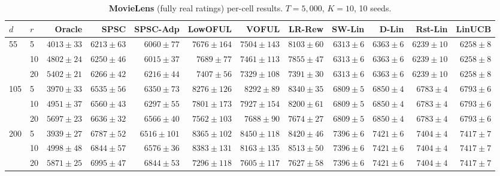\begin{table}[!htbp]
\centering
\caption{\textbf{MovieLens} (fully real ratings) per-cell results. $T{=}5{,}000$, $K{=}10$, 10 seeds.}
\label{tab:app-movielens}
\scriptsize
\setlength{\tabcolsep}{3pt}
\begin{tabular}{llrrrrrrrrrr}
\toprule
$d$ & $r$ & Oracle & \textbf{SPSC} & \textbf{SPSC-Adp} & LowOFUL & VOFUL & LR-Rew & SW-Lin & D-Lin & Rst-Lin & LinUCB \\
\midrule
55 & 5 & $4013{\pm}33$ & \cellcolor{green!12}$6213{\pm}63$ & \cellcolor{green!12}$6060{\pm}77$ & $7676{\pm}164$ & $7504{\pm}143$ & $8103{\pm}60$ & $6313{\pm}6$ & $6363{\pm}6$ & \underline{$6239{\pm}10$} & $6258{\pm}8$ \\
 & 10 & $4802{\pm}24$ & $6250{\pm}46$ & \cellcolor{green!12}$6015{\pm}37$ & $7689{\pm}77$ & $7461{\pm}113$ & $7855{\pm}47$ & $6313{\pm}6$ & $6363{\pm}6$ & \underline{$6239{\pm}10$} & $6258{\pm}8$ \\
 & 20 & $5402{\pm}21$ & $6266{\pm}42$ & \cellcolor{green!12}$6216{\pm}44$ & $7407{\pm}56$ & $7329{\pm}108$ & $7391{\pm}30$ & $6313{\pm}6$ & $6363{\pm}6$ & \underline{$6239{\pm}10$} & $6258{\pm}8$ \\
105 & 5 & $3970{\pm}33$ & \cellcolor{green!12}$6535{\pm}56$ & \cellcolor{green!12}$6350{\pm}73$ & $8276{\pm}126$ & $8292{\pm}89$ & $8340{\pm}35$ & $6809{\pm}5$ & $6850{\pm}4$ & \underline{$6783{\pm}4$} & $6793{\pm}6$ \\
 & 10 & $4951{\pm}37$ & \cellcolor{green!12}$6560{\pm}43$ & \cellcolor{green!12}$6297{\pm}55$ & $7801{\pm}173$ & $7927{\pm}154$ & $8200{\pm}61$ & $6809{\pm}5$ & $6850{\pm}4$ & \underline{$6783{\pm}4$} & $6793{\pm}6$ \\
 & 20 & $5697{\pm}23$ & \cellcolor{green!12}$6636{\pm}32$ & \cellcolor{green!12}$6566{\pm}40$ & $7562{\pm}103$ & $7688{\pm}90$ & $7674{\pm}27$ & $6809{\pm}5$ & $6850{\pm}4$ & \underline{$6783{\pm}4$} & $6793{\pm}6$ \\
200 & 5 & $3939{\pm}27$ & \cellcolor{green!12}$6787{\pm}52$ & \cellcolor{green!12}$6516{\pm}101$ & $8365{\pm}102$ & $8450{\pm}118$ & $8420{\pm}46$ & \underline{$7396{\pm}6$} & $7421{\pm}6$ & $7404{\pm}4$ & $7417{\pm}7$ \\
 & 10 & $4998{\pm}48$ & \cellcolor{green!12}$6844{\pm}57$ & \cellcolor{green!12}$6576{\pm}36$ & $8383{\pm}131$ & $8163{\pm}135$ & $8513{\pm}50$ & \underline{$7396{\pm}6$} & $7421{\pm}6$ & $7404{\pm}4$ & $7417{\pm}7$ \\
 & 20 & $5871{\pm}25$ & \cellcolor{green!12}$6995{\pm}47$ & \cellcolor{green!12}$6844{\pm}53$ & \underline{$7296{\pm}118$} & $7605{\pm}117$ & $7627{\pm}58$ & $7396{\pm}6$ & $7421{\pm}6$ & $7404{\pm}4$ & $7417{\pm}7$ \\
\bottomrule
\end{tabular}
\end{table}

